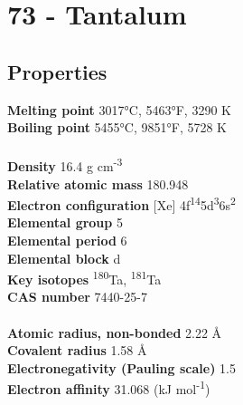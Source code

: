 \section{73 - Tantalum}
\label{sec:elem-tantalum}
\subsection{Properties}
\textbf{Melting point} 3017°C, 5463°F, 3290 K\\
\textbf{Boiling point} 5455°C, 9851°F, 5728 K\\
\\
\textbf{Density} 16.4 g cm\textsuperscript{-3}\\
\textbf{Relative atomic mass} 180.948\\
\textbf{Electron configuration} [Xe] 4f\textsuperscript{14}5d\textsuperscript{3}6s\textsuperscript{2}\\
\textbf{Elemental group} 5\\
\textbf{Elemental period} 6\\
\textbf{Elemental block} d\\
\textbf{Key isotopes} \textsuperscript{180}Ta, \textsuperscript{181}Ta\\
\textbf{CAS number} 7440-25-7\\
\\
\textbf{Atomic radius, non-bonded} 2.22 Å\\
\textbf{Covalent radius} 1.58 Å\\
\textbf{Electronegativity (Pauling scale)} 1.5\\
\textbf{Electron affinity} 31.068 (kJ mol\textsuperscript{-1})\\